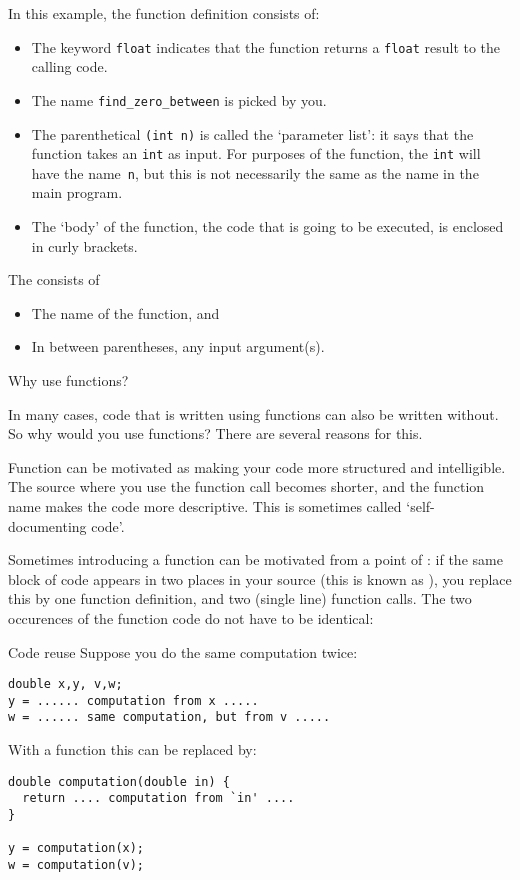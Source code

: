 In this example, the function definition consists of:
\begin{itemize}
\item The  keyword \lstinline{float} indicates that the function 
  returns a \lstinline{float} result to the calling code.
\item The name \lstinline{find_zero_between} is picked by you.
\item The parenthetical \lstinline{(int n)} is called the `parameter list': it
  says that the function takes an \lstinline{int} as input. For purposes of
  the function, the \lstinline{int} will have the name~\lstinline{n}, but this is not
  necessarily the same as the name in the main program.
\item The `body' of the function, the code that is going to be
  executed, is enclosed in curly brackets.
\end{itemize}

The  consists of
\begin{itemize}
\item The name of the function, and
\item In between parentheses, any input argument(s).
\end{itemize}

 {Why use functions?}

In many cases, code that is written using functions can also be
written without. So why would you use functions? There are several
reasons for this.

Function can be motivated as making your code more structured and intelligible.
The source where you use the function call becomes shorter,
and the function
name makes the code more descriptive. This is sometimes called
`self-documenting code'.

Sometimes introducing a function can be motivated from a point of
: if the same block of code appears in two
places in your source (this is known as
), you replace this by one function
definition, and two (single line) function calls.  The two occurences
of the function code do not have to be identical:


\begin{block}{Code reuse}
  \label{sl:reuse}
Suppose you do the same computation twice:
\begin{lstlisting}
double x,y, v,w;
y = ...... computation from x .....
w = ...... same computation, but from v .....
\end{lstlisting}
With a function this can be replaced by:
\begin{lstlisting}
double computation(double in) {
  return .... computation from `in' ....
}

y = computation(x);
w = computation(v);
\end{lstlisting}
\end{block}

